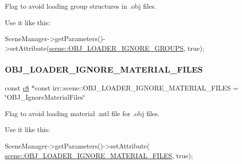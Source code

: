Flag to avoid loading group structures in .obj files. 

Use it like this\+: 
\begin{DoxyCode}
SceneManager->getParameters()->setAttribute(\hyperlink{namespaceirr_1_1scene_acdf95538086272945defdef3b8f5b6d6}{scene::OBJ\_LOADER\_IGNORE\_GROUPS},
       \textcolor{keyword}{true});
\end{DoxyCode}
 \mbox{\label{namespaceirr_1_1scene_afa0b3bc0e55abdf926f09a7094c74de3}} 
\subsubsection{\texorpdfstring{O\+B\+J\+\_\+\+L\+O\+A\+D\+E\+R\+\_\+\+I\+G\+N\+O\+R\+E\+\_\+\+M\+A\+T\+E\+R\+I\+A\+L\+\_\+\+F\+I\+L\+ES}{OBJ\_LOADER\_IGNORE\_MATERIAL\_FILES}}
{\footnotesize\ttfamily const \hyperlink{namespaceirr_a9395eaea339bcb546b319e9c96bf7410}{c8} $\ast$const irr\+::scene\+::\+O\+B\+J\+\_\+\+L\+O\+A\+D\+E\+R\+\_\+\+I\+G\+N\+O\+R\+E\+\_\+\+M\+A\+T\+E\+R\+I\+A\+L\+\_\+\+F\+I\+L\+ES = \char`\"{}O\+B\+J\+\_\+\+Ignore\+Material\+Files\char`\"{}}



Flag to avoid loading material .mtl file for .obj files. 

Use it like this\+: 
\begin{DoxyCode}
SceneManager->getParameters()->setAttribute(
      \hyperlink{namespaceirr_1_1scene_afa0b3bc0e55abdf926f09a7094c74de3}{scene::OBJ\_LOADER\_IGNORE\_MATERIAL\_FILES}, \textcolor{keyword}{true});
\end{DoxyCode}
 \mbox{\label{namespaceirr_1_1scene_a9f673de5be36d1ea444d8a0c0861ca05}} 
